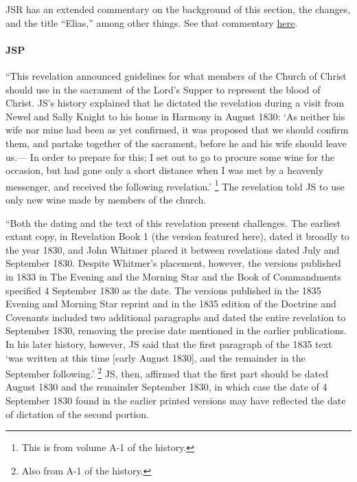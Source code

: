 			JSR has an extended commentary on the background of this section, the changes, and the title ``Elias,'' among other things. See that commentary \hyperref[EXSS-DC27-JSR]{here}.
		
		\paragraph{JSP}
		
			``This revelation announced guidelines for what members of the Church of Christ should use in the sacrament of the Lord's Supper to represent the blood of Christ. JS's history explained that he dictated the revelation during a visit from Newel and Sally Knight to his home in Harmony in August 1830: `As neither his wife nor mine had been as yet confirmed, it was proposed that we should confirm them, and partake together of the sacrament, before he and his wife should leave us.--- In order to prepare for this; I set out to go to procure some wine for the occasion, but had gone only a short distance when I was met by a heavenly messenger, and received the following revelation.'%
				\footnote{%
					This is from volume A-1 of the history.
					}
			The revelation told JS to use only new wine made by members of the church.
			
			``Both the dating and the text of this revelation present challenges. The earliest extant copy, in Revelation Book 1 (the version featured here), dated it broadly to the year 1830, and John Whitmer placed it between revelations dated July and September 1830. Despite Whitmer's placement, however, the versions published in 1833 in The Evening and the Morning Star and the Book of Commandments specified 4 September 1830 as the date. The versions published in the 1835 Evening and Morning Star reprint and in the 1835 edition of the Doctrine and Covenants included two additional paragraphs and dated the entire revelation to September 1830, removing the precise date mentioned in the earlier publications. In his later history, however, JS said that the first paragraph of the 1835 text `was written at this time [early August 1830], and the remainder in the September following.'%
				\footnote{%
					Also from A-1 of the history.
					}
			JS, then, affirmed that the first part should be dated August 1830 and the remainder September 1830, in which case the date of 4 September 1830 found in the earlier printed versions may have reflected the date of dictation of the second portion.
			
